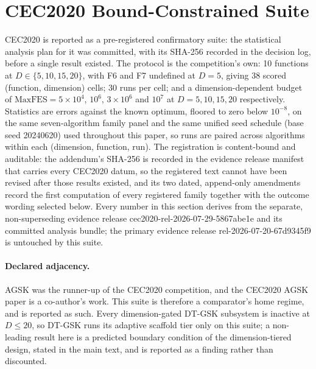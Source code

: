 \documentclass[algorithms,article,submit,moreauthors,pdftex]{Definitions/mdpi}
\newcommand{\dtgsk}{DT-GSK}
\begin{document}
\section{CEC2020 Bound-Constrained Suite}\label{sec:supp:cec2020}

\noindent CEC2020 is reported as a pre-registered confirmatory suite: the
statistical analysis plan for it was committed, with its SHA-256 recorded in
the decision log, before a single result existed.  The protocol is the
competition's own: 10 functions at
$D \in \{5, 10, 15, 20\}$, with F6 and F7 undefined at $D = 5$, giving 38
scored (function, dimension) cells; 30 runs per cell; and a
dimension-dependent budget of $\mathrm{MaxFES} = 5 \times 10^{4}$,
$10^{6}$, $3 \times 10^{6}$ and $10^{7}$ at $D = 5, 10, 15, 20$
respectively.  Statistics are errors against the known optimum, floored to
zero below $10^{-8}$, on the same seven-algorithm family panel and the same
unified seed schedule (base seed 20240620) used throughout this paper, so
runs are paired across algorithms within each (dimension, function, run).
The registration is content-bound and auditable: the addendum's SHA-256 is
recorded in the evidence release manifest that carries every CEC2020 datum,
so the registered text cannot have been revised after those results existed,
and its two dated,
append-only amendments record the first computation of every registered
family together with the outcome wording selected below.  Every number in
this section derives from the separate, non-superseding evidence release
cec2020-rel-2026-07-29-5867abe1e and its committed analysis bundle; the
primary evidence release rel-2026-07-20-67d9345f9 is untouched by this
suite.

\paragraph{Declared adjacency.}
AGSK was the runner-up of the CEC2020 competition, and
the CEC2020 AGSK paper is a co-author's work.  This suite is therefore a comparator's home regime, and
is reported as such.  Every dimension-gated \dtgsk{} subsystem is inactive
at $D \le 20$, so \dtgsk{} runs its adaptive scaffold tier only on this
suite; a non-leading result here is a predicted boundary condition of the
dimension-tiered design, stated in the main text, and is reported as a
finding rather than discounted.
\end{document}
